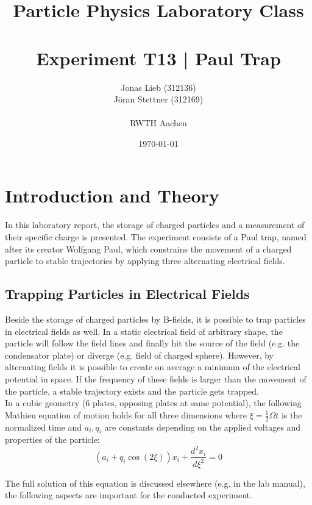 \documentclass[
	paper=A4,
	parskip=full,
	chapterprefix=true,
	11pt,
	headings=normal,
	bibliography=totoc,
	listof=totoc,
	titlepage=on,
]{scrreprt}
\date{\today}
\title{Particle Physics Laboratory Class \\ \quad \\ Experiment T13 | Paul Trap }
\author{Jonas Lieb (312136) \\ Jöran Stettner (312169) \\ \\  RWTH Aachen}
\begin{document}
\maketitle

\cleardoublepage

\setcounter{tocdepth}{2}
\tableofcontents

\cleardoublepage

\chapter{Introduction and Theory}

In this laboratory report, the storage of charged particles and a measurement of their specific charge is presented. The experiment consists of a Paul trap, named after its creator Wolfgang Paul, which constrains the movement of a charged particle to stable trajectories by applying three alternating electrical fields. 

\section{Trapping Particles in Electrical Fields}

Beside the storage of charged particles by B-fields, it is possible to trap particles in electrical fields as well. In a static electrical field of arbitrary shape, the particle will follow the field lines and finally hit the source of the field (e.g. the condensator plate) or diverge (e.g. field of charged sphere). However, by alternating fields it is possible to create on average a minimum of the electrical potential in space. If the frequency of these fields is larger than the movement of the particle, a stable trajectory exists and the particle gets trapped. \\

In a cubic geometry (6 plates, opposing plates at same potential), the following Mathieu equation of motion holds for all three dimensions where $\xi = \frac{1}{2} \Omega t$ is the normalized time and $a_i, q_i$ are constants depending on the applied voltages and properties of the particle:
\begin{equation}
\label{eq:mathieu}
\left(a_i+q_i \cos(2 \xi)\right) x_i + \frac{d^2x_i}{d\xi^2} = 0  
\end{equation}

The full solution of this equation is discussed elsewhere (e.g. in the lab manual\cite{Lab_manual}), the following aspects are important for the conducted experiment.
\end{document}

